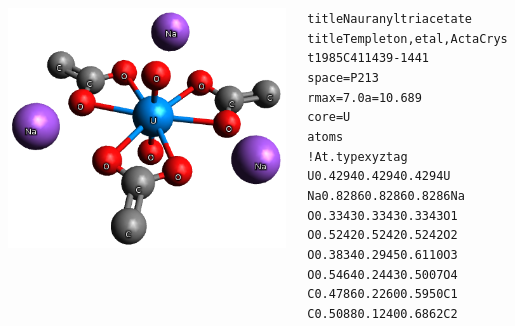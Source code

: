 \documentclass[10pt, xcolor=x11names, compress]{beamer}
\begin{document}
\begin{frame}[fragile]
\begin{columns}[T]
\begin{column}{0.3\linewidth}
      \includegraphics[width=\linewidth]{../ATEA/mfc/NaU_triacetate.png}
    \end{column}
    \begin{column}{0.7\linewidth}
      \begin{center}
        \begin{minipage}{0.75\linewidth}
          \begin{block}{}
            \tiny
            \begin{alltt}
{\color{Green4}title Na uranyl triacetate}
{\color{Green4}title Templeton, et al, Acta Cryst 1985 C41 1439-1441}
{\color{SteelBlue4}space} = P 21 3
{\color{SteelBlue4}rmax}  = 7.0    {\color{SteelBlue4}a}=10.689
{\color{SteelBlue4}core}  = U
{\color{Purple4}atoms}
{\color{Blue4}! At.type   x        y       z       tag}
  U     0.4294    0.4294    0.4294  U 
  Na    0.8286    0.8286    0.8286  Na
  O     0.3343    0.3343    0.3343  O1
  O     0.5242    0.5242    0.5242  O2
  O     0.3834    0.2945    0.6110  O3
  O     0.5464    0.2443    0.5007  O4
  C     0.4786    0.2260    0.5950  C1
  C     0.5088    0.1240    0.6862  C2 
            \end{alltt}
          \end{block}
        \end{minipage}
      \end{center}
    \end{column}
  \end{columns}
\end{frame}
\end{document}
